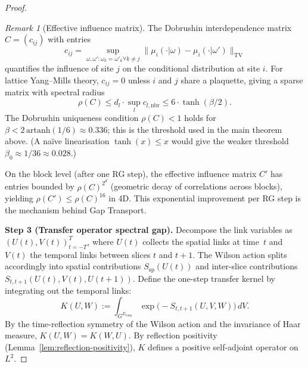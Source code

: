 \documentclass[12pt,a4paper]{article}
\theoremstyle{definition}
\theoremstyle{plain}
\theoremstyle{remark}
\newtheorem{remark}[definition]{Remark}
\begin{document}
\begin{proof}
\begin{remark}[Effective influence matrix]
\label{rem:influence-matrix}
The Dobrushin interdependence matrix $C = (c_{ij})$ with entries
\[
c_{ij} = \sup_{\omega, \omega': \omega_k = \omega'_k \forall k \neq j} \| \mu_i(\cdot | \omega) - \mu_i(\cdot | \omega') \|_{\mathrm{TV}}
\]
quantifies the influence of site $j$ on the conditional distribution at site $i$. For lattice Yang--Mills theory, $c_{ij} = 0$ unless $i$ and $j$ share a plaquette, giving a sparse matrix with spectral radius
\[
\rho(C) \leq d_l \cdot \sup_{l} c_{l, \mathrm{nbr}} \leq 6 \cdot \tanh(\beta/2).
\]
The Dobrushin uniqueness condition $\rho(C) < 1$ holds for $\beta < 2\,\mathrm{artanh}(1/6) \approx 0.336$; this is the threshold used in the main theorem above. (A na\"ive linearisation $\tanh(x) \leq x$ would give the weaker threshold $\beta_0 \approx 1/36 \approx 0.028$.)

On the block level (after one RG step), the effective influence matrix $C'$ has entries bounded by $\rho(C)^{2^d}$ (geometric decay of correlations across blocks), yielding $\rho(C') \leq \rho(C)^{16}$ in 4D. This exponential improvement per RG step is the mechanism behind Gap Transport.
\end{remark}

\medskip
\noindent\textbf{Step 3 (Transfer operator spectral gap).}
Decompose the link variables as $(U(t), V(t))_{t=-T}^T$, where $U(t)$ collects the spatial links at time~$t$ and $V(t)$ the temporal links between slices $t$ and $t+1$. The Wilson action splits accordingly into spatial contributions $S_{\mathrm{sp}}(U(t))$ and inter-slice contributions $S_{t,t+1}(U(t), V(t), U(t+1))$. Define the one-step transfer kernel by integrating out the temporal links:
\begin{equation}\label{eq:transfer-kernel}
    K(U, W) := \int_{G^{E_{\mathrm{temp}}}} \exp\!\bigl(-S_{t,t+1}(U, V, W)\bigr)\,dV.
\end{equation}
By the time-reflection symmetry of the Wilson action and the invariance of Haar measure, $K(U,W) = K(W,U)$. By reflection positivity (Lemma~\ref{lem:reflection-positivity}), $K$ defines a positive self-adjoint operator on $L^2$.


\end{proof}
\end{document}
